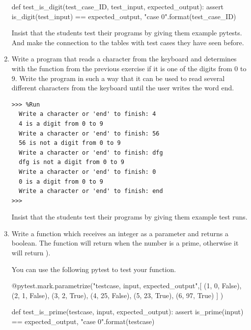 \documentclass[
  fontsize=10pt,
  a4paper,
]{scrartcl}
\newenvironment{howTILEd}%
  {\begin{mdframed}[skipabove=10pt,skipbelow=10pt,backgroundcolor=pink!40]}%
  {\end{mdframed}}
\begin{document}
\begin{enumerate}
\begin{small}
\begin{python}
def test_is_digit(test_case_ID, test_input, expected_output):
    assert is_digit(test_input) == expected_output, "case {0}".format(test_case_ID)
\end{python}
\end{small}


\begin{howTILEd}
Insist that the students test their programs by giving them example pytests. 
And make the connection to the tables with test cases they have seen before.
\end{howTILEd}



\item Write a program that reads a character from the keyboard and determines with the function  from the previous exercise if it is one of the digits from 0 to 9. Write the program in such a way that it can be used to read several different characters from the keyboard until the user writes the word end.

\begin{Verbatim}[frame=single, label={\em examples of test executions}]
>>> %Run 
  Write a character or 'end' to finish: 4
  4 is a digit from 0 to 9
  Write a character or 'end' to finish: 56
  56 is not a digit from 0 to 9
  Write a character or 'end' to finish: dfg
  dfg is not a digit from 0 to 9
  Write a character or 'end' to finish: 0
  0 is a digit from 0 to 9
  Write a character or 'end' to finish: end
>>>    
\end{Verbatim}


\begin{howTILEd}
Insist that the students test their programs by giving them example test runs.
\end{howTILEd}


\item Write a function  which receives an integer as a parameter and returns a boolean. The function will return  when the number is a prime, otherwise it will return ). 

You can use the following pytest to test your function.

\begin{python}
@pytest.mark.parametrize("testcase, input, expected_output",[
    (1, 0, False),
    (2, 1, False),
    (3, 2, True),
    (4, 25, False),
    (5, 23, True),
    (6, 97, True)
    ]
)

def test_is_prime(testcase, input, expected_output):
    assert is_prime(input) == expected_output, "case {0}".format(testcase)
\end{python}


\end{enumerate}
\end{document}
